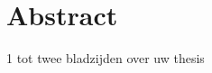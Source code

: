 \documentclass[main_adjusted]{subfiles}
\begin{document}
\chapter*{Abstract}
1 tot twee bladzijden over uw thesis
\end{document}
